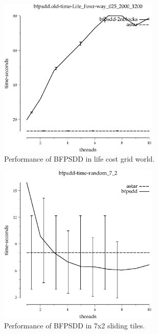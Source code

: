 \documentclass{article}
\begin{document}
\begin{figure}[h!]
\includegraphics[width=3in]{../graphs/seth/grid-life-single/BFPSDD.eps}
\caption{Performance of BFPSDD in life cost grid world.}
\label{fig:BFPSDD-life}
\end{figure}

\begin{figure}[h!]
\includegraphics[width=3in]{../graphs/seth/tiles-single/BFPSDD.eps}
\caption{Performance of BFPSDD in 7x2 sliding tiles.}
\label{fig:BFPSDD-life}
\end{figure}
\end{document}
